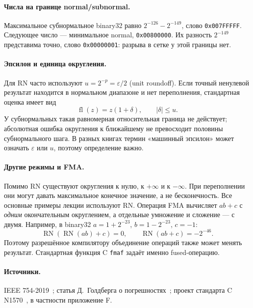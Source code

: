 \paragraph{Числа на границе normal/subnormal.}
Максимальное субнормальное binary32 равно $2^{-126}-2^{-149}$,
слово \texttt{0x007FFFFF}. Следующее число --- минимальное normal,
\texttt{0x00800000}. Их разность $2^{-149}$ представима точно,
слово \texttt{0x00000001}: разрыва в сетке у этой границы нет.

\paragraph{Эпсилон и единица округления.}
Для RN часто используют $u=2^{-p}=\varepsilon/2$ (unit roundoff).
Если точный ненулевой результат находится в нормальном диапазоне
и нет переполнения, стандартная оценка имеет вид
\[
\operatorname{fl}(z)=z(1+\delta),\qquad |\delta|\le u.
\]
У субнормальных такая равномерная относительная граница не действует;
абсолютная ошибка округления к ближайшему не превосходит
половины субнормального шага. В разных книгах термин «машинный эпсилон»
может означать $\varepsilon$ или $u$, поэтому определение важно.

\paragraph{Другие режимы и FMA.}
Помимо RN существуют округления к нулю, к $+\infty$ и к $-\infty$.
При переполнении они могут давать максимальное конечное значение,
а не бесконечность. Все основные примеры лекции используют RN.
Операция FMA вычисляет $ab+c$ с \emph{одним} окончательным округлением,
а отдельные умножение и сложение --- с двумя. Например, в binary32
$a=1+2^{-23}$, $b=1-2^{-23}$, $c=-1$:
\[
\operatorname{RN}(\operatorname{RN}(ab)+c)=0,
\qquad \operatorname{RN}(ab+c)=-2^{-46}.
\]
Поэтому разрешённое компилятору объединение операций также может менять
результат. Стандартная функция C \texttt{fmaf} задаёт именно fused-операцию.

\paragraph{Источники.}
IEEE 754-2019~\cite{ieee-754}; статья Д.~Голдберга о
погрешностях~\cite{goldberg-floating-point}; проект стандарта C
N1570~\cite{c11-draft}, в частности приложение F.
